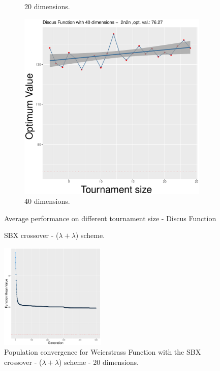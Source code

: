 \begin{figure}[!t]
\begin{subfigure}[b]{0.33\textwidth}
		\caption{20 dimensions.}
	\end{subfigure}
	\begin{subfigure}[b]{0.33\textwidth}
		\centering
		\includegraphics[width=\textwidth]{img/2n2n-40D/unimodal_2n2n_11_dim_40.pdf}
		\caption{40 dimensions.}
	\end{subfigure}
	\caption{SBX crossover - ($\lambda + \lambda$) scheme.}
	\label{sbx-11-B}
	\Large{Average performance on different tournament size - Discus Function}
\end{figure}


\begin{figure}[t]
	\includegraphics[width=0.45\textwidth]{img/covergency_multimodal_2n2n_16_dim_20_tsize_16.pdf}
	\caption{Population convergence for Weierstrass Function with the SBX crossover - ($\lambda + \lambda$) scheme - 20 dimensions.}
	\label{convergence-sbx-16-b}
\end{figure}

